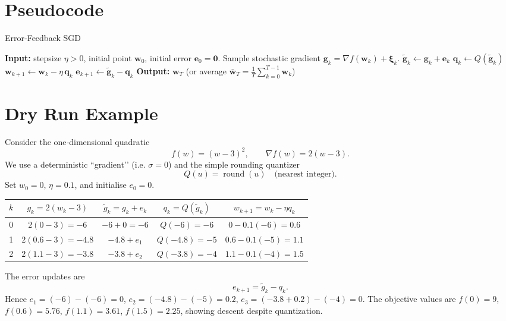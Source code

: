 \documentclass{article}
\begin{document}
\section*{Pseudocode}
\begin{algorithm}[H]
\caption{Error‑Feedback SGD}
\begin{algorithmic}[1]
\State \textbf{Input:} stepsize $\eta>0$, initial point $\bm w_0$, initial error $\bm e_0=\bm 0$.
    \State Sample stochastic gradient $\bm g_k = \nabla f(\bm w_k)+\bm\xi_k$.
    \State $\tilde{\bm g}_k \gets \bm g_k + \bm e_k$ 
    \State $\bm q_k \gets Q(\tilde{\bm g}_k)$ 
    \State $\bm w_{k+1} \gets \bm w_k - \eta\,\bm q_k$ 
    \State $\bm e_{k+1} \gets \tilde{\bm g}_k - \bm q_k$ 
\EndFor
\State \textbf{Output:} $\bm w_T$ (or average $\bar{\bm w}_T=\frac1T\sum_{k=0}^{T-1}\bm w_k$)
\end{algorithmic}
\end{algorithm}

\section*{Dry Run Example}
Consider the one‑dimensional quadratic 
\[
f(w)=(w-3)^2,\qquad \nabla f(w)=2(w-3).
\]
We use a deterministic “gradient’’ (i.e. $\sigma=0$) and the simple rounding quantizer 
\[
Q(u)=\operatorname{round}(u) \quad\text{(nearest integer)}.
\]
Set $w_0=0$, $\eta=0.1$, and initialise $e_0=0$.

\begin{center}
\begin{tabular}{c|c|c|c|c}
$k$ & $g_k=2(w_k-3)$ & $\tilde g_k=g_k+e_k$ & $q_k=Q(\tilde g_k)$ & $w_{k+1}=w_k-\eta q_k$ \\ \hline
0 & $2(0-3)=-6$ & $-6+0=-6$ & $Q(-6)=-6$ & $0-0.1(-6)=0.6$ \\[2mm]
1 & $2(0.6-3)=-4.8$ & $-4.8+e_1$ & $Q(-4.8)=-5$ & $0.6-0.1(-5)=1.1$ \\[2mm]
2 & $2(1.1-3)=-3.8$ & $-3.8+e_2$ & $Q(-3.8)=-4$ & $1.1-0.1(-4)=1.5$ 
\end{tabular}
\end{center}
The error updates are
\[
e_{k+1}= \tilde g_k-q_k.
\]
Hence $e_1=(-6)-(-6)=0$, $e_2=(-4.8)-(-5)=0.2$, $e_3=(-3.8+0.2)-(-4)=0$.
The objective values are $f(0)=9$, $f(0.6)=5.76$, $f(1.1)=3.61$, $f(1.5)=2.25$, showing descent despite quantization.

\newpage
\end{document}
